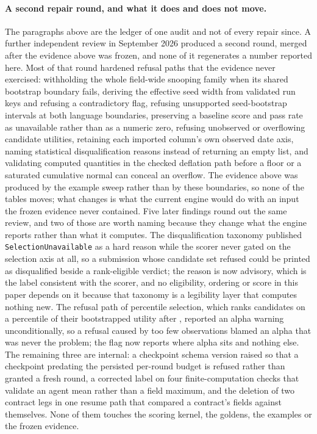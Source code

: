 \paragraph{A second repair round, and what it does and does not move.} The paragraphs above are the ledger of one audit and not of every repair since. A further independent review in September 2026 produced a second round, merged after the evidence above was frozen, and none of it regenerates a number reported here. Most of that round hardened refusal paths that the evidence never exercised: withholding the whole field-wide snooping family when its shared bootstrap boundary fails, deriving the effective seed width from validated run keys and refusing a contradictory flag, refusing unsupported seed-bootstrap intervals at both language boundaries, preserving a baseline score and pass rate as unavailable rather than as a numeric zero, refusing unobserved or overflowing candidate utilities, retaining each imported column's own observed date axis, naming statistical disqualification reasons instead of returning an empty list, and validating computed quantities in the checked deflation path before a floor or a saturated cumulative normal can conceal an overflow. The evidence above was produced by the example sweep rather than by these boundaries, so none of the tables moves; what changes is what the current engine would do with an input the frozen evidence never contained. Five later findings round out the same review, and two of those are worth naming because they change what the engine reports rather than what it computes. The disqualification taxonomy published \texttt{SelectionUnavailable} as a hard reason while the scorer never gated on the selection axis at all, so a submission whose candidate set refused could be printed as disqualified beside a rank-eligible verdict; the reason is now advisory, which is the label consistent with the scorer, and no eligibility, ordering or score in this paper depends on it because that taxonomy is a legibility layer that computes nothing new. The refusal path of percentile selection, which ranks candidates on a percentile of their bootstrapped utility after \citet[p.~11]{oliveira2025bootstrap}, reported an alpha warning unconditionally, so a refusal caused by too few observations blamed an alpha that was never the problem; the flag now reports where alpha sits and nothing else. The remaining three are internal: a checkpoint schema version raised so that a checkpoint predating the persisted per-round budget is refused rather than granted a fresh round, a corrected label on four finite-computation checks that validate an agent mean rather than a field maximum, and the deletion of two contract legs in one resume path that compared a contract's fields against themselves. None of them touches the scoring kernel, the goldens, the examples or the frozen evidence.

